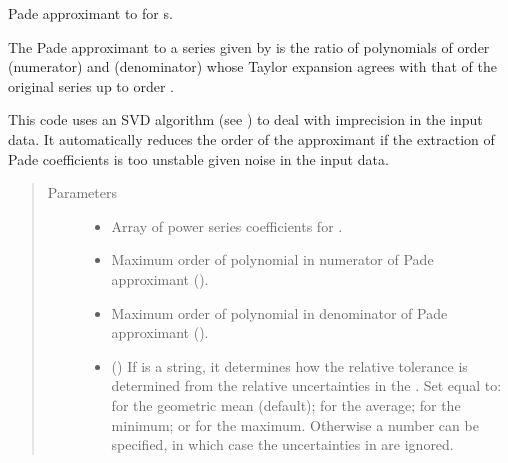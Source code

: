 \documentclass[letterpaper,10pt,english]{sphinxmanual}
\begin{document}

\begin{fulllineitems}
\label{\detokenize{g2tools:g2tools.pade_gvar}}
\sphinxcode{{[}m,n{]}} Pade approximant to  for s.

The \sphinxcode{{[}m,n{]}} Pade approximant to a series given by
 is the ratio of  polynomials of order 
(numerator) and  (denominator) whose  Taylor expansion agrees
with that of the original series up to order .

This code uses an SVD algorithm (see {\hyperref[\detokenize{g2tools:g2tools.pade_svd}]{}}) to deal with
imprecision in the input data. It automatically reduces
the order of the approximant if the extraction of Pade coefficients
is too unstable given noise in the input data.
\begin{quote}\begin{description}
\item[{Parameters}] \leavevmode\begin{itemize}
\item {} 
 \textendash{} Array  of power series coefficients for .

\item {} 
 \textendash{} Maximum order of polynomial in numerator of Pade
approximant ().

\item {} 
 \textendash{} Maximum order of polynomial in denominator of Pade
approximant ().

\item {} 
 () \textendash{} If  is a string, it determines how the
relative tolerance is determined from the relative
uncertainties in the . Set  equal to:
 for the geometric mean (default);  for
the average;  for the minimum; or  for
the maximum. Otherwise a number can be specified, in which case
the uncertainties in  are ignored.


\end{itemize}
\end{description}
\end{quote}
\end{fulllineitems}
\end{document}
